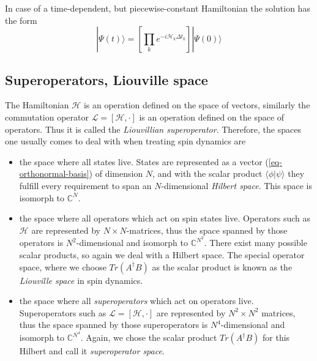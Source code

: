 \documentclass[11.5pt,a4paper]{article}
\begin{document}
In case of a time-dependent, but piecewise-constant Hamiltonian the solution has the form
\begin{equation}
 |\Psi(t)\rangle = \left[ \prod_k e^{-i\mathcal{H}_k \Delta t_k} \right] |\Psi(0)\rangle
\end{equation}

\subsection{Superoperators, Liouville space}
The Hamiltonian $\mathcal{H}$ is an operation defined on the space of vectors, similarly the commutation operator $\mathcal{L} = [\mathcal{H}, \cdot ]$ is an operation defined on the space of operators. Thus it is called the \emph{Liouvillian superoperator}. Therefore, the spaces one usually comes to deal with when treating spin dynamics are

\begin{itemize}
 \item the space where all states live. States are represented as a vector (\ref{eq-orthonormal-basis}) of dimension $N$, and with the scalar product $\langle \phi | \psi \rangle$ they fulfill every requirement to span an $N$-dimensional \emph{Hilbert space}. This space is isomorph to $\mathbb{C}^N$.
  \item the space where all operators which act on spin states live. Operators such as $\mathcal{H}$ are represented by $N\times N$-matrices, thus the space spanned by those operators is $N^2$-dimensional and isomorph to $\mathbb{C}^{N^2}$. There exist many possible scalar products, so again we deal with a Hilbert space. The special operator space, where we choose $Tr(A^\dagger B)$ as the scalar product is known as the \emph{Liouville space} in spin dynamics.
  \item the space where all \emph{superoperators} which act on operators live. Superoperators such as $\mathcal{L} = [\mathcal{H}, \cdot ]$ are represented by $N^2 \times N^2$ matrices, thus the space spanned by those superoperators is $N^4$-dimensional and isomorph to $\mathbb{C}^{N^4}$. Again, we chose the scalar product $Tr(A^\dagger B)$ for this Hilbert and call it \emph{superoperator space}.
\end{itemize}
\end{document}

